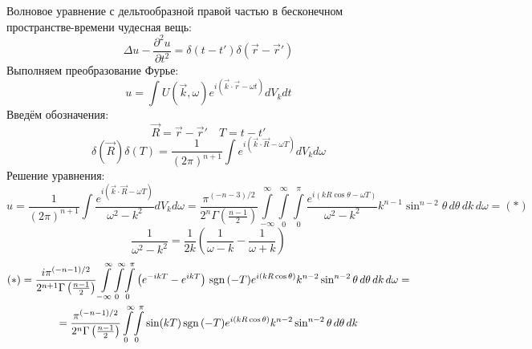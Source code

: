 Волновое уравнение с дельтообразной правой частью в бесконечном пространстве-времени чудесная вещь:
\[
	\Delta u - \frac{\partial^2 u}{\partial t^2} = \delta(t - t')\delta(\vec{r} - \vec{r}') 
\]
Выполняем преобразование Фурье:
\[
	u = \int U(\vec{k}, \omega) e^{i(\vec{k}\cdot\vec{r} - \omega t)} dV_k dt
\]
Введём обозначения:
\[
	\vec{R} = \vec{r} - \vec{r}' \quad T = t - t'
\]
\[
	\delta(\vec{R}) \delta(T) = \frac{1}{(2\pi)^{n + 1}} \int e^{i(\vec{k}\cdot\vec{R} - \omega T)} dV_k d\omega
\]
Решение уравнения:
\[
	u = \frac{1}{(2\pi)^{n + 1}} \int \frac{e^{i(\vec{k}\cdot\vec{R} - \omega T)}}{\omega^2 - k^2} dV_k d\omega =  
	\frac{\pi^{(- n - 3)/2}}{2^n\Gamma\left(\frac{n - 1}{2}\right)} 
	\int\limits_{-\infty}^{\infty}\!
	\int\limits_{0}^{\infty}\!
	\int\limits_{0}^{\pi}
	 \frac{e^{i(k R \cos \theta - \omega T)}}{\omega^2 - k^2} k^{n - 1} \sin^{n - 2} \theta\, d\theta\, dk\, d\omega = (*)
\]
\[
	\frac{1}{\omega^2 - k^2} = \frac{1}{2k} \left(\frac{1}{\omega - k} - \frac{1}{\omega + k} \right)
\]
\[
	\begin{gathered}
	(*) =
	\frac{i \pi^{(- n - 1)/2}}{2^{n + 1}\Gamma\left(\frac{n - 1}{2}\right)} 
	\int\limits_{-\infty}^{\infty}\!
	\int\limits_{0}^{\infty}\!
	\int\limits_{0}^{\pi}
	\left(e^{ - i k T}  - e^{i k T} \right) \mathrm{\,sgn}\,(-T)
	e^{i(k R \cos \theta)} 
	k^{n - 2} \sin^{n - 2} \theta\, d\theta\, dk\, d\omega 
	= \\ =
	\frac{\pi^{(- n - 1)/2}}{2^{n}\Gamma\left(\frac{n - 1}{2}\right)} 
	\int\limits_{0}^{\infty}\!
	\int\limits_{0}^{\pi}
	\sin (kT) \mathrm{\,sgn}\,(-T)
	e^{i(k R \cos \theta)} 
	k^{n - 2} \sin^{n - 2} \theta\, d\theta\, dk
	\end{gathered} 
\]